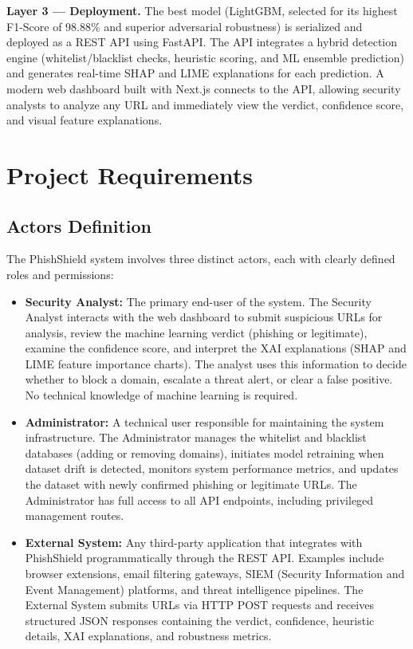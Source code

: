 \textbf{Layer 3 — Deployment.} The best model (LightGBM, selected for its highest F1-Score of 98.88\% and superior adversarial robustness) is serialized and deployed as a REST API using FastAPI. The API integrates a hybrid detection engine (whitelist/blacklist checks, heuristic scoring, and ML ensemble prediction) and generates real-time SHAP and LIME explanations for each prediction. A modern web dashboard built with Next.js connects to the API, allowing security analysts to analyze any URL and immediately view the verdict, confidence score, and visual feature explanations.

\section{Project Requirements}

\subsection{Actors Definition}

The PhishShield system involves three distinct actors, each with clearly defined roles and permissions:

\begin{itemize}
    \item \textbf{Security Analyst:} The primary end-user of the system. The Security Analyst interacts with the web dashboard to submit suspicious URLs for analysis, review the machine learning verdict (phishing or legitimate), examine the confidence score, and interpret the XAI explanations (SHAP and LIME feature importance charts). The analyst uses this information to decide whether to block a domain, escalate a threat alert, or clear a false positive. No technical knowledge of machine learning is required.

    \item \textbf{Administrator:} A technical user responsible for maintaining the system infrastructure. The Administrator manages the whitelist and blacklist databases (adding or removing domains), initiates model retraining when dataset drift is detected, monitors system performance metrics, and updates the dataset with newly confirmed phishing or legitimate URLs. The Administrator has full access to all API endpoints, including privileged management routes.

    \item \textbf{External System:} Any third-party application that integrates with PhishShield programmatically through the REST API. Examples include browser extensions, email filtering gateways, SIEM (Security Information and Event Management) platforms, and threat intelligence pipelines. The External System submits URLs via HTTP POST requests and receives structured JSON responses containing the verdict, confidence, heuristic details, XAI explanations, and robustness metrics.
\end{itemize}

